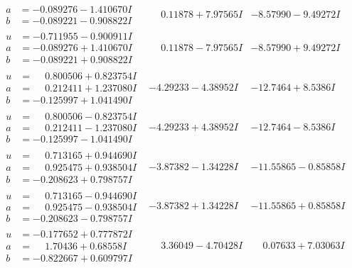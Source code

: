 \documentclass[1p]{elsarticle_modified}
\theoremstyle{definition}
\begin{document}
$$\begin{array}{c|c|c}
\begin{aligned}
a &= -0.089276 - 1.410670 I \\
b &= -0.089221 - 0.908822 I\end{aligned}
 & \phantom{-}0.11878 + 7.97565 I & -8.57990 - 9.49272 I \\ \hline\begin{aligned}
u &= -0.711955 - 0.900911 I \\
a &= -0.089276 + 1.410670 I \\
b &= -0.089221 + 0.908822 I\end{aligned}
 & \phantom{-}0.11878 - 7.97565 I & -8.57990 + 9.49272 I \\ \hline\begin{aligned}
u &= \phantom{-}0.800506 + 0.823754 I \\
a &= \phantom{-}0.212411 + 1.237080 I \\
b &= -0.125997 + 1.041490 I\end{aligned}
 & -4.29233 - 4.38952 I & -12.7464 + 8.5386 I \\ \hline\begin{aligned}
u &= \phantom{-}0.800506 - 0.823754 I \\
a &= \phantom{-}0.212411 - 1.237080 I \\
b &= -0.125997 - 1.041490 I\end{aligned}
 & -4.29233 + 4.38952 I & -12.7464 - 8.5386 I \\ \hline\begin{aligned}
u &= \phantom{-}0.713165 + 0.944690 I \\
a &= \phantom{-}0.925475 + 0.938504 I \\
b &= -0.208623 + 0.798757 I\end{aligned}
 & -3.87382 - 1.34228 I & -11.55865 - 0.85858 I \\ \hline\begin{aligned}
u &= \phantom{-}0.713165 - 0.944690 I \\
a &= \phantom{-}0.925475 - 0.938504 I \\
b &= -0.208623 - 0.798757 I\end{aligned}
 & -3.87382 + 1.34228 I & -11.55865 + 0.85858 I \\ \hline\begin{aligned}
u &= -0.177652 + 0.777872 I \\
a &= \phantom{-}1.70436 + 0.68558 I \\
b &= -0.822667 + 0.609797 I\end{aligned}
 & \phantom{-}3.36049 - 4.70428 I & \phantom{-}0.07633 + 7.03063 I \\ \hline\begin{aligned}

\end{aligned}
\end{array}$$
\end{document}

